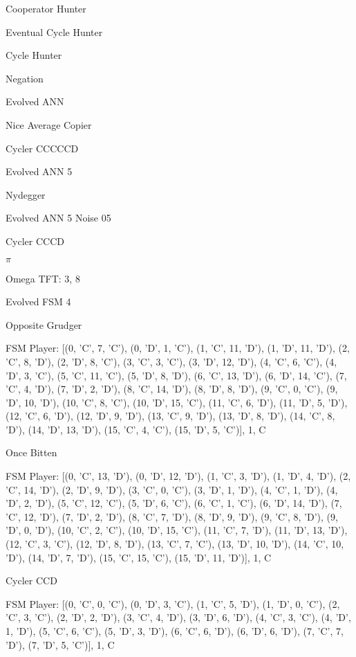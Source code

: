 \item Cooperator Hunter
\item Eventual Cycle Hunter
\item Cycle Hunter
\item Negation
\item Evolved ANN
\item Nice Average Copier
\item Cycler CCCCCD
\item Evolved ANN 5
\item Nydegger
\item Evolved ANN 5 Noise 05
\item Cycler CCCD
\item $\pi$
\item Omega TFT: 3, 8
\item Evolved FSM 4
\item Opposite Grudger
\item FSM Player: [(0, 'C', 7, 'C'), (0, 'D', 1, 'C'), (1, 'C', 11, 'D'), (1, 'D', 11, 'D'), (2, 'C', 8, 'D'), (2, 'D', 8, 'C'), (3, 'C', 3, 'C'), (3, 'D', 12, 'D'), (4, 'C', 6, 'C'), (4, 'D', 3, 'C'), (5, 'C', 11, 'C'), (5, 'D', 8, 'D'), (6, 'C', 13, 'D'), (6, 'D', 14, 'C'), (7, 'C', 4, 'D'), (7, 'D', 2, 'D'), (8, 'C', 14, 'D'), (8, 'D', 8, 'D'), (9, 'C', 0, 'C'), (9, 'D', 10, 'D'), (10, 'C', 8, 'C'), (10, 'D', 15, 'C'), (11, 'C', 6, 'D'), (11, 'D', 5, 'D'), (12, 'C', 6, 'D'), (12, 'D', 9, 'D'), (13, 'C', 9, 'D'), (13, 'D', 8, 'D'), (14, 'C', 8, 'D'), (14, 'D', 13, 'D'), (15, 'C', 4, 'C'), (15, 'D', 5, 'C')], 1, C
\item Once Bitten
\item FSM Player: [(0, 'C', 13, 'D'), (0, 'D', 12, 'D'), (1, 'C', 3, 'D'), (1, 'D', 4, 'D'), (2, 'C', 14, 'D'), (2, 'D', 9, 'D'), (3, 'C', 0, 'C'), (3, 'D', 1, 'D'), (4, 'C', 1, 'D'), (4, 'D', 2, 'D'), (5, 'C', 12, 'C'), (5, 'D', 6, 'C'), (6, 'C', 1, 'C'), (6, 'D', 14, 'D'), (7, 'C', 12, 'D'), (7, 'D', 2, 'D'), (8, 'C', 7, 'D'), (8, 'D', 9, 'D'), (9, 'C', 8, 'D'), (9, 'D', 0, 'D'), (10, 'C', 2, 'C'), (10, 'D', 15, 'C'), (11, 'C', 7, 'D'), (11, 'D', 13, 'D'), (12, 'C', 3, 'C'), (12, 'D', 8, 'D'), (13, 'C', 7, 'C'), (13, 'D', 10, 'D'), (14, 'C', 10, 'D'), (14, 'D', 7, 'D'), (15, 'C', 15, 'C'), (15, 'D', 11, 'D')], 1, C
\item Cycler CCD
\item FSM Player: [(0, 'C', 0, 'C'), (0, 'D', 3, 'C'), (1, 'C', 5, 'D'), (1, 'D', 0, 'C'), (2, 'C', 3, 'C'), (2, 'D', 2, 'D'), (3, 'C', 4, 'D'), (3, 'D', 6, 'D'), (4, 'C', 3, 'C'), (4, 'D', 1, 'D'), (5, 'C', 6, 'C'), (5, 'D', 3, 'D'), (6, 'C', 6, 'D'), (6, 'D', 6, 'D'), (7, 'C', 7, 'D'), (7, 'D', 5, 'C')], 1, C
